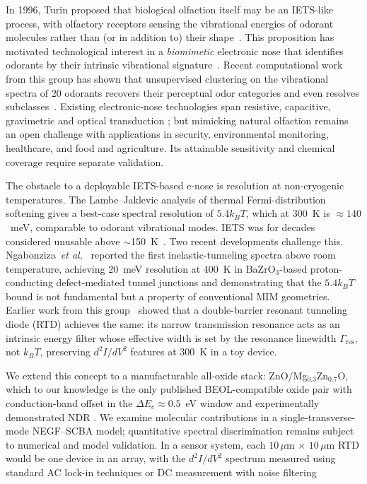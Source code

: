 \documentclass[conference]{IEEEtran}
\begin{document}
In 1996, Turin proposed that biological olfaction itself may be an IETS-like process, with olfactory receptors sensing the vibrational energies of odorant molecules rather than (or in addition to) their shape~\cite{turin1996}. This proposition has motivated technological interest in a \emph{biomimetic} electronic nose that identifies odorants by their intrinsic vibrational signature~\cite{patil2018,bommisetty2008,patil2013mit, li2024}. Recent computational work from this group has shown that unsupervised clustering on the vibrational spectra of 20 odorants recovers their perceptual odor categories and even resolves subclasses~\cite{pandey2021}. Existing electronic-nose technologies span resistive, capacitive, gravimetric and optical transduction \cite{rock2008}; but mimicking natural olfaction remains an open challenge with applications in security, environmental monitoring, healthcare, and food and agriculture. Its attainable sensitivity and chemical coverage require separate validation.

The obstacle to a deployable IETS-based e-nose is resolution at non-cryogenic temperatures. The Lambe--Jaklevic analysis of thermal Fermi-distribution softening gives a best-case spectral resolution of $5.4 k_B T$, which at 300~K is $\approx 140$~meV, comparable to odorant vibrational modes. IETS was for decades considered unusable above $\sim$150~K~\cite{jaklevic1966}. Two recent developments challenge this. Ngabonziza~\textit{et al.}~\cite{ngabonziza2021} reported the first inelastic-tunneling spectra above room temperature, achieving 20~meV resolution at 400~K in BaZrO$_3$-based proton-conducting defect-mediated tunnel junctions and demonstrating that the $5.4 k_B T$ bound is not fundamental but a property of conventional MIM geometries. Earlier work from this group~\cite{patil2018} showed that a double-barrier resonant tunneling diode (RTD) achieves the same: its narrow transmission resonance acts as an intrinsic energy filter whose effective width is set by the resonance linewidth $\Gamma_{\mathrm{res}}$, not $k_BT$, preserving $d^2I/dV^2$ features at 300~K in a toy device. 

We extend this concept to a manufacturable all-oxide stack: ZnO/Mg$_{0.3}$Zn$_{0.7}$O, which to our knowledge is the only published BEOL-compatible oxide pair with conduction-band offset in the $\Delta E_c \approx 0.5$~eV window and experimentally demonstrated NDR \cite{krishnamoorthy2002}. We examine molecular contributions in a single-transverse-mode NEGF--SCBA model; quantitative spectral discrimination remains subject to numerical and model validation. In a sensor system, each $10\,\mu$m $\times$ $10\,\mu$m RTD would be one device in an array, with the $d^2I/dV^2$ spectrum measured using standard AC lock-in techniques or DC measurement with noise filtering~\cite{kesarwani2022}
\end{document}
